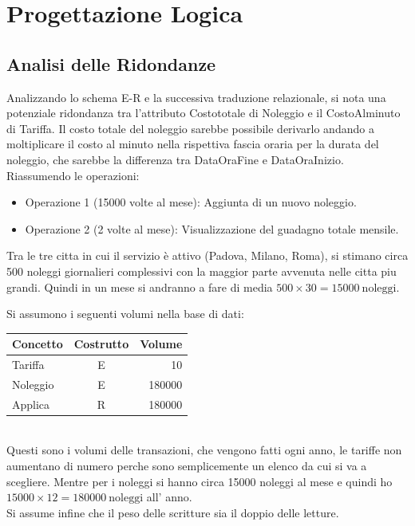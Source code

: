 \documentclass[11pt,a4paper]{article}
\begin{document}
\section{Progettazione Logica}
\subsection{Analisi delle Ridondanze}
Analizzando lo schema E-R e la successiva traduzione relazionale, si nota una potenziale ridondanza tra l'attributo Costototale di Noleggio e il CostoAlminuto di Tariffa.
Il costo totale del noleggio sarebbe possibile derivarlo andando a moltiplicare il costo al minuto nella rispettiva fascia oraria per la durata del noleggio,
che sarebbe la differenza tra DataOraFine e DataOraInizio. Riassumendo le operazioni:
\begin{itemize}
    \item Operazione 1 (15000 volte al mese): Aggiunta di un nuovo noleggio.
    \item Operazione 2 (2 volte al mese): Visualizzazione del guadagno totale mensile.
\end{itemize}
Tra le tre citta in cui il servizio è attivo (Padova, Milano, Roma), si stimano circa 500 noleggi giornalieri complessivi
con la maggior parte avvenuta nelle citta piu grandi.
Quindi in un mese si andranno a fare di media $500 \times 30 = 15000 \ \mathrm{noleggi.}$

Si assumono i seguenti volumi nella base di dati:
\begin{table}[!h]
    \centering
    \setlength{\tabcolsep}{12pt} %
    \renewcommand{\arraystretch}{1.2} %

    \begin{tabular}{|l|c|r|}
        \hline
        \textbf{Concetto} & \textbf{Costrutto} & \textbf{Volume} \\ \hline
        Tariffa           & E                  & 10              \\ \hline
        Noleggio          & E                  & 180000          \\ \hline
        Applica           & R                  & 180000          \\ \hline
    \end{tabular}

    \vspace{0.3cm}

\end{table} \\
Questi sono i volumi delle transazioni, che vengono fatti ogni anno, le tariffe non aumentano di numero
perche sono semplicemente un elenco da cui si va a scegliere. Mentre per i noleggi si hanno circa
15000 noleggi al mese e quindi ho $15000 \times 12 = 180000 \ \mathrm{noleggi}$ all' anno.\\
Si assume infine che il peso delle scritture sia il doppio delle letture.
\end{document}
